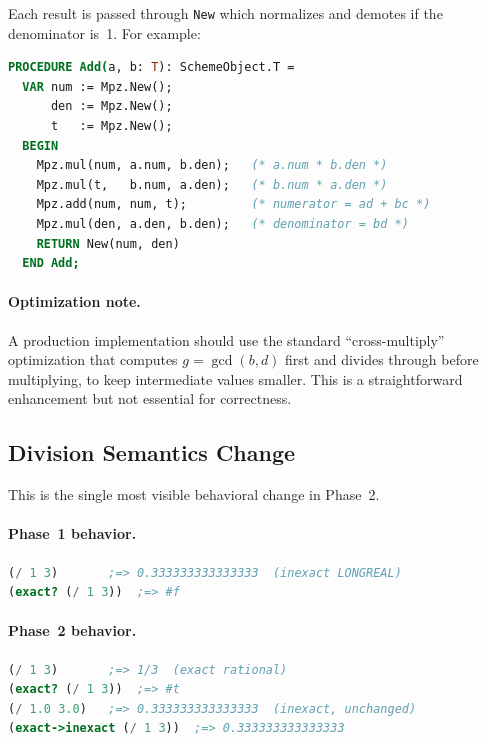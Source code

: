 \documentclass[12pt]{article}
\begin{document}
\noindent Each result is passed through {\tt New} which normalizes
and demotes if the denominator is~1.  For example:

\begin{lstlisting}[language=Modula3]
PROCEDURE Add(a, b: T): SchemeObject.T =
  VAR num := Mpz.New();
      den := Mpz.New();
      t   := Mpz.New();
  BEGIN
    Mpz.mul(num, a.num, b.den);   (* a.num * b.den *)
    Mpz.mul(t,   b.num, a.den);   (* b.num * a.den *)
    Mpz.add(num, num, t);         (* numerator = ad + bc *)
    Mpz.mul(den, a.den, b.den);   (* denominator = bd *)
    RETURN New(num, den)
  END Add;
\end{lstlisting}

\paragraph{Optimization note.}
A production implementation should use the standard
``cross-multiply'' optimization that computes
$g = \gcd(b, d)$ first and divides through before
multiplying, to keep intermediate values smaller.  This
is a straightforward enhancement but not essential for
correctness.

\subsection{Division Semantics Change}
\label{sec:div-change}

This is the single most visible behavioral change in Phase~2.

\paragraph{Phase~1 behavior.}
\begin{lstlisting}[language=Scheme]
(/ 1 3)       ;=> 0.333333333333333  (inexact LONGREAL)
(exact? (/ 1 3))  ;=> #f
\end{lstlisting}

\paragraph{Phase~2 behavior.}
\begin{lstlisting}[language=Scheme]
(/ 1 3)       ;=> 1/3  (exact rational)
(exact? (/ 1 3))  ;=> #t
(/ 1.0 3.0)   ;=> 0.333333333333333  (inexact, unchanged)
(exact->inexact (/ 1 3))  ;=> 0.333333333333333
\end{lstlisting}
\end{document}
